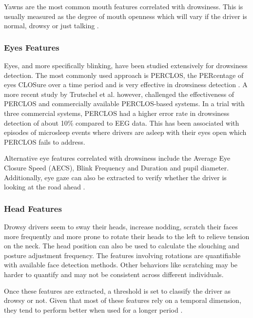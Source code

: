 \documentclass[12pt]{extarticle}
\begin{document}
Yawns are the most common mouth features correlated with drowsiness.
This is usually measured as the degree of mouth openness which will vary
if the driver is normal, drowsy or just talking
\cite{qiong_wang_driver_2006}.

\hypertarget{eyes-features}{%
\subsubsection{Eyes Features}\label{eyes-features}}

Eyes, and more specifically blinking, have been studied extensively for
drowsiness detection. The most commonly used approach is PERCLOS, the
PERcentage of eyes CLOSure over a time period and is very effective in
drowsiness detection \cite{sahayadhas_detecting_2012}. A more recent
study by Trutschel et al. \cite{trutschel_perclos:_2011} however,
challenged the effectiveness of PERCLOS and commercially available
PERCLOS-based systems. In a trial with three commercial systems, PERCLOS
had a higher error rate in drowsiness detection of about 10\% compared
to EEG data. This has been associated with episodes of microsleep events
where drivers are asleep with their eyes open which PERCLOS fails to
address.

Alternative eye features correlated with drowsiness include the Average
Eye Closure Speed (AECS), Blink Frequency and Duration and pupil
diameter. Additionally, eye gaze can also be extracted to verify whether
the driver is looking at the road ahead \cite{qiong_wang_driver_2006}.

\hypertarget{head-features}{%
\subsubsection{Head Features}\label{head-features}}

Drowsy drivers seem to sway their heads, increase nodding, scratch their
faces more frequently and more prone to rotate their heads to the left
to relieve tension on the neck. The head position can also be used to
calculate the slouching and posture adjustment frequency. The features
involving rotations are quantifiable with available face detection
methods. Other behaviors like scratching may be harder to quantify and
may not be consistent across different individuals.
\cite{eskandarian_evaluation_2007}

Once these features are extracted, a threshold is set to classify the
driver as drowsy or not. Given that most of these features rely on a
temporal dimension, they tend to perform better when used for a longer
period \cite{wilkinson_accuracy_2013}.
\end{document}
